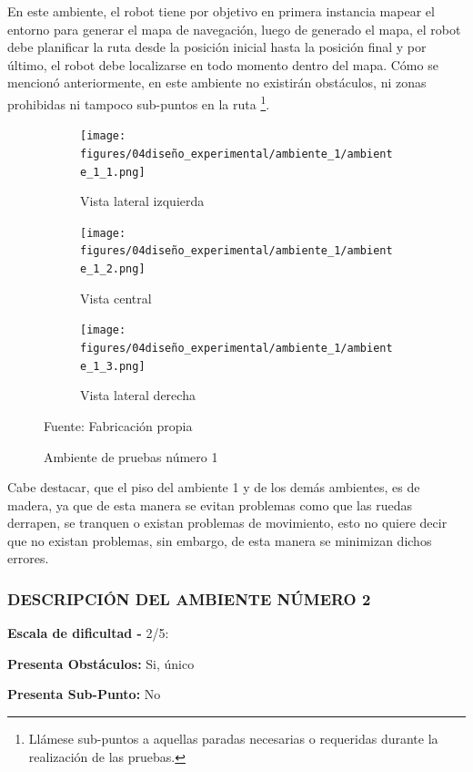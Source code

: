 En este ambiente, el robot tiene por objetivo en primera instancia mapear el entorno para generar el mapa de navegación, luego de generado el mapa, el robot debe planificar la ruta desde la posición inicial hasta la posición final y por último, el robot debe localizarse en todo momento dentro del mapa. Cómo se mencionó anteriormente, en este ambiente no existirán obstáculos, ni zonas prohibidas ni tampoco sub-puntos en la ruta \footnote{Llámese sub-puntos a aquellas paradas necesarias o requeridas durante la realización de las pruebas.}.

\begin{figure}[H]
    \centering
    \begin{subfigure}[b]{0.30\textwidth}
    \texttt{[image: figures/04diseño\_experimental/ambiente\_1/ambiente\_1\_1.png]}
    \caption{Vista lateral izquierda}
    \label{fig:ambiente_1_1}
    \end{subfigure}
    \begin{subfigure}[b]{0.30\textwidth}
    \texttt{[image: figures/04diseño\_experimental/ambiente\_1/ambiente\_1\_2.png]}
    \caption{Vista central}
    \label{fig:ambiente_1_2}
    \end{subfigure}
    \begin{subfigure}[b]{0.30\textwidth}
    \texttt{[image: figures/04diseño\_experimental/ambiente\_1/ambiente\_1\_3.png]}
    \caption{Vista lateral derecha}
    \label{fig:ambiente_1_3}
    \end{subfigure}
    \caption{Ambiente de pruebas número 1 }
    Fuente: Fabricación propia
    \label{fig:ambiente_1}
\end{figure} 

Cabe destacar, que el piso del ambiente 1 y de los demás ambientes, es de madera, ya que de esta manera se evitan problemas como que las ruedas derrapen, se tranquen o existan problemas de movimiento, esto no quiere decir que no existan problemas, sin embargo, de esta manera se minimizan dichos errores.

\newpage
\subsubsection{DESCRIPCIÓN DEL AMBIENTE NÚMERO 2}
\textbf{Escala de dificultad -} 2/5:

\hspace{5mm} \textbf{Presenta Obstáculos:} Si, único

\hspace{5mm} \textbf{Presenta Sub-Punto:} No

